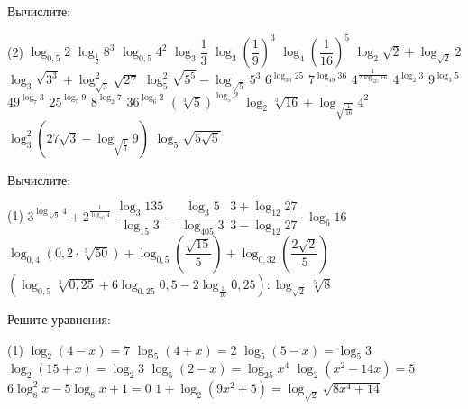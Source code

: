 \begin{class}[number=2]
\begin{definit}
	\end{definit}
	\begin{listofex}[resume]
		\item Вычислите:
		\begin{tasks}(2)
			\task \( \log_{0,5}2 \)
			\task \( \log_{\frac{1}{2}}8^3 \)
			\task \( \log_{0,5}4^2 \)
			\task \( \log_3 \dfrac{1}{3} \)
			\task \( \log_3 \left(  \dfrac{1}{9} \right)^3 \)
			\task \( \log_4 \left(  \dfrac{1}{16} \right)^5 \)
			\task \( \log_2 \sqrt{2} + \log_{\sqrt{2}}2 \)
			\task \( \log_3 \sqrt{3^3} + \log^2_{\sqrt{3}}\sqrt{27} \)
			\task \( \log^2_5 \sqrt{5^5} - \log_{\sqrt{5}}5^3 \)
			\task \( 6^{\log_{36} 25} \)
			\task \( 7^{\log_{49} 36} \)
			\task \( 4^{\tfrac{1}{2\log_{625} 16 }} \)
			\task \( 4^{\log_2 3} \)
			\task \( 9^{\log_3 5} \)
			\task \( 49^{\log_7 3} \)
			\task \( 25^{\log_5 9} \)
			\task \( 8^{\log_2 7} \)
			\task \( 36^{\log_6 2} \)
			\task \( (\sqrt[3]{5})^{\log_5 2} \)
			\task \( \log_2 \sqrt[3]{16} + \log_{\sqrt{\frac{1}{16}}}4^{2} \)
			\task \( \log^2_3 (27\sqrt{3} - \log_{\sqrt{\frac{1}{3}}}9) \)
			\task \( \log_5 \sqrt{5\sqrt{5}} \)
		\end{tasks}
		\newpage
		\item Вычислите:
		\begin{tasks}(1)
			\task \( 3^{\log_{\sqrt[3]{9}}4} +2^{\tfrac{1}{\log_{16} 4}} \)
			\task \( \dfrac{\log_3 135}{\log_{15} 3} - \dfrac{\log_3 5}{\log_{405} 3} \)
			\task \( \dfrac{3+\log_{12}27}{3-\log_{12} 27} \cdot \log_6 16 \)
			\task \( \log_{0,4}(0,2 \cdot \sqrt[3]{50}) + \log_{0,5}\left( \dfrac{\sqrt{15}}{5} \right) + \log_{0,32} \left( \dfrac{2\sqrt{2}}{5} \right)  \)
			\task \( \left( \log_{0,5} \sqrt[3]{0,25} + 6\log_{0,25} 0,5 - 2 \log_{\frac{1}{16}}0,25 \right) : \log_{\sqrt{2}}\sqrt[5]{8} \)
		\end{tasks}
		
		\item Решите уравнения: %
		\begin{tasks}(1)
			\task \( \log_2 (4-x)=7 \)
			\task \( \log_5(4+x)=2 \)
			\task \( \log_5(5-x)=\log_5 3 \)
			\task \( \log_2(15+x)=\log_2 3 \)
			\task \( \log_5 (2-x) = \log_{25} x^4 \)
			\task \( \log_2 (x^2-14x)=5 \)
			\task \( 6 \log^2_8 x -5\log_8 x+1=0 \)
			\task \( 1+\log_2(9x^2+5)=\log_{\sqrt{2}} \sqrt{8x^4+14} \)
		\end{tasks}
	\end{listofex}
\end{class}

